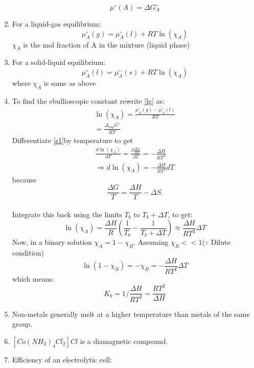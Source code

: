 \documentclass{article}
\numberwithin{equation}{section}
\numberwithin{figure}{section}
\begin{document}
\begin{enumerate}
		\begin{equation}\label{cp}
		\mu^{\circ}(A)=\Delta G^{\circ}_{A}
		\end{equation}
	\item For a liquid-gas equilibrium:
		\begin{equation}\label{lg}
			\mu^{\circ}_{A}(g)=\mu^{\circ}_{A}(l)+RT\ln(\chi_{A})
		\end{equation}
		$\chi_{A}$ is the mol fraction of A in the mixture (liquid phase)
	\item For a solid-liquid equilibrium:
		\begin{equation}
			\mu^{\circ}_{A}(l)=\mu^{\circ}_{A}(s)+RT\ln(\chi_{A})
		\end{equation}
		where $\chi_{A}$ is same as above
	\item To find the ebullioscopic constant rewrite \ref{lg} as:
		\begin{align}\label{s1}
			\ln(\chi_A)=\frac{\mu^{\circ}_{A}(g)-\mu^{\circ}_{A}(l)}{RT}\\
			=\frac{\Delta_{vap}G^{\circ}}{RT}
		\end{align}
	Differentiate \ref{s1}by temperature to get
		\begin{align}
			\frac{d\ln(\chi_A)}{dT}=\frac{\partial\frac{\Delta G}{RT}}{\partial T}=-\frac{\Delta H}{RT^2}\\
			\Rightarrow d\ln(\chi_A)=-\frac{\Delta H}{RT^2}dT
		\end{align}
	because $$ \frac{\Delta G}{T}=\frac{\Delta H}{T}-\Delta S.$$\\
	Integrate this back using the limits $T_b$ to $T_b+\Delta T$, to get:
		\begin{equation}
			\ln(\chi_A)=\frac{\Delta H}{R}\left(\frac{1}{T_b}-\frac{1}{T_b+\Delta T}\right)
			\approx \frac{\Delta H}{RT^2}\Delta T
		\end{equation}
	Now, in a binary solution $\chi_A=1-\chi_B$. Assuming $\chi_B <<1$($\because$ Dilute condition)
		\begin{equation}
			\ln(1-\chi_B)=-\chi_B=-\frac{\Delta H}{RT^2}\Delta T
		\end{equation}
		 which means:
		 \begin{equation}
			 \boxed{K_b=1/\frac{\Delta H}{RT^2}=\frac{RT^2}{\Delta H}}
		 \end{equation}
	\item Non-metals generally melt at a higher temperature than metals of the same group.
	\item $[Co(NH_3)_4Cl_2]Cl$ is a diamagnetic compound.
	\item Efficiency of an electrolytic cell:

\end{enumerate}
\end{document}
